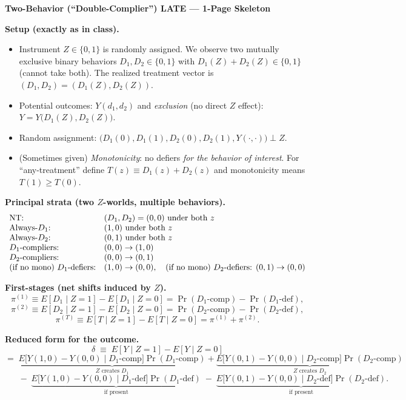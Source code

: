\documentclass[10pt]{article}
\begin{document}
\small

\textbf{\Large Two-Behavior (``Double-Complier'') LATE --- 1-Page Skeleton}

\textbf{Setup (exactly as in class).}
\begin{itemize}
\item Instrument $Z\in\{0,1\}$ is randomly assigned. We observe two mutually exclusive binary behaviors $D_1,D_2\in\{0,1\}$ with
$D_1(Z)+D_2(Z)\in\{0,1\}$ (cannot take both). The realized treatment vector is $(D_1,D_2)=(D_1(Z),D_2(Z))$.
\item Potential outcomes: $Y(d_1,d_2)$ and \emph{exclusion} (no direct $Z$ effect): $Y=Y\!\big(D_1(Z),D_2(Z)\big)$.
\item Random assignment: $\big(D_1(0),D_1(1),D_2(0),D_2(1),Y(\cdot,\cdot)\big)\perp Z$.
\item (Sometimes given) \emph{Monotonicity}: no defiers \emph{for the behavior of interest}. For ``any-treatment'' define $T(z)\equiv D_1(z)+D_2(z)$ and monotonicity means $T(1)\ge T(0)$.
\end{itemize}

\textbf{Principal strata (two $Z$-worlds, multiple behaviors).}
\[
\begin{array}{l l}
\text{NT:}& (D_1,D_2)=(0,0)\text{ under both }z\\
\text{Always-$D_1$:}& (1,0)\text{ under both }z\\
\text{Always-$D_2$:}& (0,1)\text{ under both }z\\
\text{$D_1$-compliers:}& (0,0)\to(1,0)\\
\text{$D_2$-compliers:}& (0,0)\to(0,1)\\
\text{(if no mono) $D_1$-defiers:}& (1,0)\to(0,0),\quad \text{(if no mono) $D_2$-defiers: }(0,1)\to(0,0)
\end{array}
\]

\textbf{First-stages (net shifts induced by $Z$).}
\[
\pi^{(1)}\equiv E[D_1\!\mid Z{=}1]-E[D_1\!\mid Z{=}0]=\Pr(D_1\text{-comp})-\Pr(D_1\text{-def}),
\]
\[
\pi^{(2)}\equiv E[D_2\!\mid Z{=}1]-E[D_2\!\mid Z{=}0]=\Pr(D_2\text{-comp})-\Pr(D_2\text{-def}),
\]
\[
\pi^{(T)}\equiv E[T\!\mid Z{=}1]-E[T\!\mid Z{=}0]=\pi^{(1)}+\pi^{(2)}.
\]

\textbf{Reduced form for the outcome.}
\[
\delta\;\equiv\;E[Y\!\mid Z{=}1]-E[Y\!\mid Z{=}0]
\]
\[
=\; \underbrace{E\!\big[Y(1,0){-}Y(0,0)\mid D_1\text{-comp}\big]\Pr(D_1\text{-comp})}_{\text{$Z$ creates $D_1$}}
+\underbrace{E\!\big[Y(0,1){-}Y(0,0)\mid D_2\text{-comp}\big]\Pr(D_2\text{-comp})}_{\text{$Z$ creates $D_2$}}
\]
\[
\phantom{=}\;-\;\underbrace{E\!\big[Y(1,0){-}Y(0,0)\mid D_1\text{-def}\big]\Pr(D_1\text{-def})}_{\text{if present}}
\;-\;\underbrace{E\!\big[Y(0,1){-}Y(0,0)\mid D_2\text{-def}\big]\Pr(D_2\text{-def})}_{\text{if present}}.
\]
\end{document}
